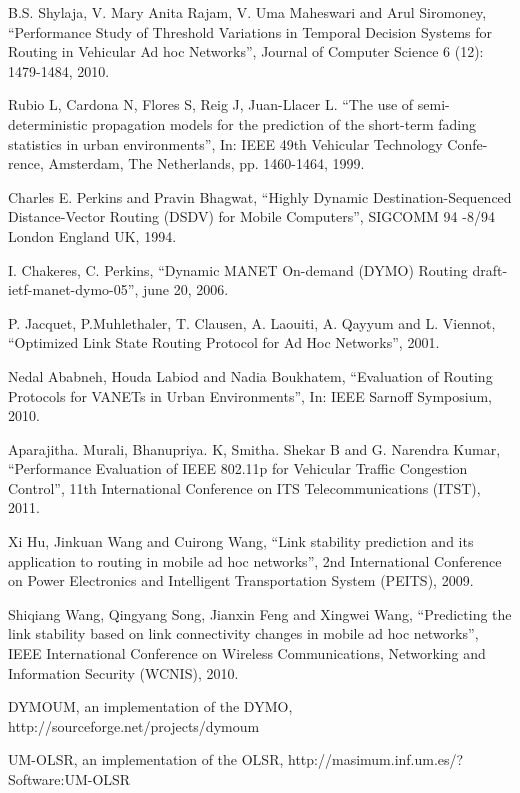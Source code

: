 \documentclass[journal]{IEEEtran}
\begin{document}
\begin{thebibliography}{00}

 B.S. Shylaja, V. Mary Anita Rajam, V. Uma Maheswari and Arul Siromoney, ``Performance Study of Threshold Variations in Temporal Decision Systems for Routing in Vehicular Ad hoc Networks'', Journal of Computer Science 6 (12): 1479-1484, 2010.

 Rubio L, Cardona N, Flores S, Reig J, Juan-Llacer L. ``The use of semi- deterministic propagation models for the prediction of the short-term fading statistics in urban environments'', In: IEEE 49th Vehicular Technology Confe- rence, Amsterdam, The Netherlands, pp. 1460-1464, 1999.

 Charles E. Perkins and Pravin Bhagwat, ``Highly Dynamic Destination-Sequenced Distance-Vector Routing (DSDV) for Mobile Computers'', SIGCOMM 94 -8/94 London England UK, 1994.

 I. Chakeres, C. Perkins, ``Dynamic MANET On-demand (DYMO) Routing draft-ietf-manet-dymo-05'', june 20, 2006.

 P. Jacquet, P.Muhlethaler, T. Clausen, A. Laouiti, A. Qayyum and L. Viennot, ``Optimized Link State Routing Protocol for Ad Hoc Networks'', 2001.

Nedal Ababneh, Houda Labiod and Nadia Boukhatem, ``Evaluation of Routing Protocols for VANETs in Urban Environments'', In: IEEE Sarnoff Symposium, 2010.

Aparajitha. Murali, Bhanupriya. K, Smitha. Shekar B and G. Narendra Kumar, ``Performance Evaluation of IEEE 802.11p for Vehicular Traffic Congestion Control'', 11th International Conference on ITS Telecommunications (ITST), 2011.

Xi Hu, Jinkuan Wang and Cuirong Wang, ``Link stability prediction and its application to routing in mobile ad hoc networks'', 2nd International Conference on Power Electronics and Intelligent Transportation System (PEITS), 2009.

Shiqiang Wang, Qingyang Song, Jianxin Feng and Xingwei Wang, ``Predicting the link stability based on link connectivity changes in mobile ad hoc networks'', IEEE International Conference on Wireless Communications, Networking and Information Security (WCNIS), 2010.

DYMOUM, an implementation of the DYMO, http://sourceforge.net/projects/dymoum

UM-OLSR, an implementation of the OLSR, http://masimum.inf.um.es/?Software:UM-OLSR


\end{thebibliography}
\end{document}
